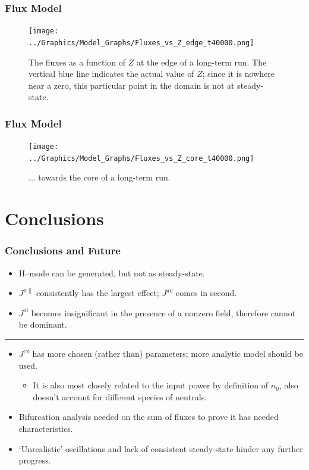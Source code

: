 \documentclass[10pt]{beamer}
\begin{document}
\begin{frame} %
\frametitle{Flux Model}

\begin{figure}[tb] %
	\centering
	\texttt{[image: ../Graphics/Model\_Graphs/Fluxes\_vs\_Z\_edge\_t40000.png]}
	\caption{The fluxes as a function of $Z$ at the edge of a long-term run.
	The vertical blue line indicates the actual value of $Z$; since it is nowhere near a zero, this particular point in the domain is not at steady-state.}
	\label{fig:fluxes_steady-state_edge_40000}
\end{figure}

\end{frame}


\begin{frame} %
\frametitle{Flux Model}

\begin{figure}[tb] %
	\centering
	\texttt{[image: ../Graphics/Model\_Graphs/Fluxes\_vs\_Z\_core\_t40000.png]}
	\caption{... towards the core of a long-term run.}
	\label{fig:fluxes_steady-state_core_40000}
\end{figure}

\end{frame}


\section{Conclusions} %
\begin{frame} %
\frametitle{Conclusions and Future}

\begin{itemize}
	\item H--mode can be generated, but not as steady-state.
	\item $J^{\pi\parallel}$ consistently has the largest effect; $J^\text{an}$ comes in second.
	\item $J^\text{ol}$ becomes insignificant in the presence of a nonzero field, therefore cannot be dominant.
\end{itemize}
\hrule
\begin{itemize}
	\item $J^\text{cx}$ has more chosen (rather than) parameters; more analytic model should be used.
	\begin{itemize}
		\item It is also most closely related to the input power by definition of $n_0$, also doesn't account for different species of neutrals.
	\end{itemize}
	\item Bifurcation analysis needed on the sum of fluxes to prove it has needed characteristics.
	\item `Unrealistic' oscillations and lack of consistent steady-state hinder any further progress.
\end{itemize}

\end{frame}
\end{document}
